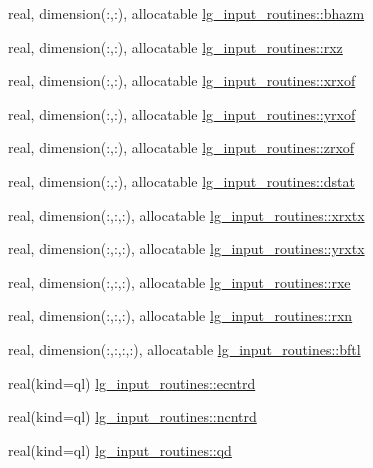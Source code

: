 \begin{DoxyCompactItemize}
\item 
real, dimension(\+:,\+:), allocatable \hyperlink{namespacelg__input__routines_aaddc398e9198a4c9e8eb40573a3f4347}{lg\+\_\+input\+\_\+routines\+::bhazm}
\item 
real, dimension(\+:,\+:), allocatable \hyperlink{namespacelg__input__routines_a49a8e3b29c968fef1668037824d295f4}{lg\+\_\+input\+\_\+routines\+::rxz}
\item 
real, dimension(\+:,\+:), allocatable \hyperlink{namespacelg__input__routines_afa609399ab44664f964450ac0c0212a3}{lg\+\_\+input\+\_\+routines\+::xrxof}
\item 
real, dimension(\+:,\+:), allocatable \hyperlink{namespacelg__input__routines_afb1d371ae725f99f0c1de7b0f5ee4f9f}{lg\+\_\+input\+\_\+routines\+::yrxof}
\item 
real, dimension(\+:,\+:), allocatable \hyperlink{namespacelg__input__routines_aa4d0d65baa1effb088dd0a2a1bcd2185}{lg\+\_\+input\+\_\+routines\+::zrxof}
\item 
real, dimension(\+:,\+:), allocatable \hyperlink{namespacelg__input__routines_a0ad3fab990ff61df0aef4ca7bb41cf23}{lg\+\_\+input\+\_\+routines\+::dstat}
\item 
real, dimension(\+:,\+:,\+:), allocatable \hyperlink{namespacelg__input__routines_a9d8ccd1fc7c88ab57fa5af75b36600f1}{lg\+\_\+input\+\_\+routines\+::xrxtx}
\item 
real, dimension(\+:,\+:,\+:), allocatable \hyperlink{namespacelg__input__routines_ae8e2697ce00581c54a3a6cffceef745b}{lg\+\_\+input\+\_\+routines\+::yrxtx}
\item 
real, dimension(\+:,\+:,\+:), allocatable \hyperlink{namespacelg__input__routines_ab5e3409ae1c1d7f9b1d0ab31c0dfa296}{lg\+\_\+input\+\_\+routines\+::rxe}
\item 
real, dimension(\+:,\+:,\+:), allocatable \hyperlink{namespacelg__input__routines_af724dc158a78913ba807173a41c49e7d}{lg\+\_\+input\+\_\+routines\+::rxn}
\item 
real, dimension(\+:,\+:,\+:,\+:), allocatable \hyperlink{namespacelg__input__routines_ac7f5afd80317e5c4f20d0f68bac9cf59}{lg\+\_\+input\+\_\+routines\+::bftl}
\item 
real(kind=ql) \hyperlink{namespacelg__input__routines_a324ba9df6f9ed5b8c67035350579f985}{lg\+\_\+input\+\_\+routines\+::ecntrd}
\item 
real(kind=ql) \hyperlink{namespacelg__input__routines_afe3e4dc2c250144c91fdb508ecc23861}{lg\+\_\+input\+\_\+routines\+::ncntrd}
\item 
real(kind=ql) \hyperlink{namespacelg__input__routines_a171b7d03fe9858fea1233f4815ae16ed}{lg\+\_\+input\+\_\+routines\+::qd}

\end{DoxyCompactItemize}
